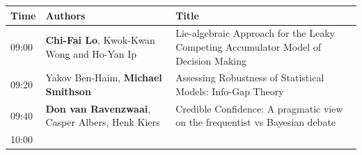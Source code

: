 \documentclass[]{article}
\begin{document}
\begin{longtable}[]{@{}lll@{}}
\toprule
\begin{minipage}[b]{0.03\columnwidth}\raggedright\strut
Time\strut
\end{minipage} & \begin{minipage}[b]{0.35\columnwidth}\raggedright\strut
Authors\strut
\end{minipage} & \begin{minipage}[b]{0.53\columnwidth}\raggedright\strut
Title\strut
\end{minipage}\tabularnewline
\midrule
\endhead
\begin{minipage}[t]{0.03\columnwidth}\raggedright\strut
09:00\strut
\end{minipage} & \begin{minipage}[t]{0.35\columnwidth}\raggedright\strut
\textbf{Chi-Fai Lo}, Kwok-Kwan Wong and Ho-Yan Ip\strut
\end{minipage} & \begin{minipage}[t]{0.53\columnwidth}\raggedright\strut
Lie-algebraic Approach for the Leaky Competing Accumulator Model of
Decision Making\strut
\end{minipage}\tabularnewline
\begin{minipage}[t]{0.03\columnwidth}\raggedright\strut
09:20\strut
\end{minipage} & \begin{minipage}[t]{0.35\columnwidth}\raggedright\strut
Yakov Ben-Haim, \textbf{Michael Smithson}\strut
\end{minipage} & \begin{minipage}[t]{0.53\columnwidth}\raggedright\strut
Assessing Robustness of Statistical Models: Info-Gap Theory\strut
\end{minipage}\tabularnewline
\begin{minipage}[t]{0.03\columnwidth}\raggedright\strut
09:40\strut
\end{minipage} & \begin{minipage}[t]{0.35\columnwidth}\raggedright\strut
\textbf{Don van Ravenzwaai}, Casper Albers, Henk Kiers\strut
\end{minipage} & \begin{minipage}[t]{0.53\columnwidth}\raggedright\strut
Credible Confidence: A pragmatic view on the frequentist vs Bayesian
debate\strut
\end{minipage}\tabularnewline
\begin{minipage}[t]{0.03\columnwidth}\raggedright\strut
10:00\strut
\end{minipage} & \begin{minipage}[t]{0.35\columnwidth}\raggedright\strut

\end{minipage}
\end{longtable}
\end{document}
